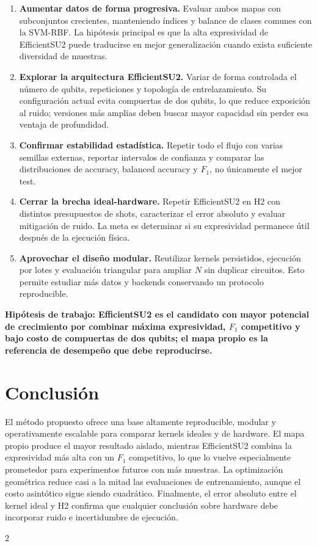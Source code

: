 \documentclass[9pt,a4paper]{extarticle}
\newcommand{\callout}[1]{\begin{center}\colorbox{pale}{\parbox{0.94\linewidth}{\centering\color{navy}\textbf{#1}}}\end{center}}
\begin{document}
\begin{enumerate}
  \item \textbf{Aumentar datos de forma progresiva.} Evaluar ambos mapas con subconjuntos crecientes, manteniendo índices y balance de clases comunes con la SVM-RBF. La hipótesis principal es que la alta expresividad de EfficientSU2 puede traducirse en mejor generalización cuando exista suficiente diversidad de muestras.
  \item \textbf{Explorar la arquitectura EfficientSU2.} Variar de forma controlada el número de qubits, repeticiones y topología de entrelazamiento. Su configuración actual evita compuertas de dos qubits, lo que reduce exposición al ruido; versiones más amplias deben buscar mayor capacidad sin perder esa ventaja de profundidad.
  \item \textbf{Confirmar estabilidad estadística.} Repetir todo el flujo con varias semillas externas, reportar intervalos de confianza y comparar las distribuciones de accuracy, balanced accuracy y $F_1$, no únicamente el mejor test.
  \item \textbf{Cerrar la brecha ideal-hardware.} Repetir EfficientSU2 en H2 con distintos presupuestos de shots, caracterizar el error absoluto y evaluar mitigación de ruido. La meta es determinar si su expresividad permanece útil después de la ejecución física.
  \item \textbf{Aprovechar el diseño modular.} Reutilizar kernels persistidos, ejecución por lotes y evaluación triangular para ampliar $N$ sin duplicar circuitos. Esto permite estudiar más datos y backends conservando un protocolo reproducible.
\end{enumerate}

\callout{Hipótesis de trabajo: EfficientSU2 es el candidato con mayor potencial de crecimiento por combinar máxima expresividad, $F_1$ competitivo y bajo costo de compuertas de dos qubits; el mapa propio es la referencia de desempeño que debe reproducirse.}

\section{Conclusión}
El método propuesto ofrece una base altamente reproducible, modular y operativamente escalable para comparar kernels ideales y de hardware. El mapa propio produce el mayor resultado aislado, mientras EfficientSU2 combina la expresividad más alta con un $F_1$ competitivo, lo que lo vuelve especialmente prometedor para experimentos futuros con más muestras. La optimización geométrica reduce casi a la mitad las evaluaciones de entrenamiento, aunque el costo asintótico sigue siendo cuadrático. Finalmente, el error absoluto entre el kernel ideal y H2 confirma que cualquier conclusión sobre hardware debe incorporar ruido e incertidumbre de ejecución.

\begin{multicols}{2}


\end{multicols}
\end{document}
